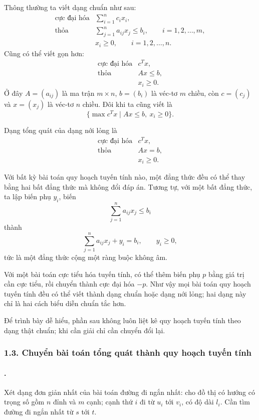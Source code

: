 \documentclass[11pt]{article}
\begin{document}
Thông thường ta viết dạng chuẩn như sau:
\[
\begin{array}{ll}
\text{cực đại hóa} & \displaystyle \sum_{i=1}^{n} c_ix_i,\\[0.4em]
\text{thỏa} & \displaystyle \sum_{j=1}^{n}a_{ij}x_j\le b_i,
  \qquad i=1,2,\ldots,m,\\[0.4em]
& x_i\ge 0,\qquad i=1,2,\ldots,n.
\end{array}
\]
Cũng có thể viết gọn hơn:
\[
\begin{array}{ll}
\text{cực đại hóa} & c^Tx,\\
\text{thỏa} & Ax\le b,\\
& x_i\ge 0.
\end{array}
\]
Ở đây \(A=(a_{ij})\) là ma trận \(m\times n\), \(b=(b_i)\) là véc-tơ
\(m\) chiều, còn \(c=(c_j)\) và \(x=(x_j)\) là véc-tơ \(n\) chiều. Đôi khi
ta cũng viết là
\[
  \{\max c^Tx\mid Ax\le b,\ x_i\ge 0\}.
\]

Dạng tổng quát của dạng nới lỏng là
\[
\begin{array}{ll}
\text{cực đại hóa} & c^Tx,\\
\text{thỏa} & Ax=b,\\
& x_i\ge 0.
\end{array}
\]

Với bất kỳ bài toán quy hoạch tuyến tính nào, một đẳng thức đều có thể thay
bằng hai bất đẳng thức mà không đổi đáp án. Tương tự, với một bất đẳng thức,
ta lập biến phụ \(y_i\), biến
\[
  \sum_{j=1}^{n}a_{ij}x_j\le b_i
\]
thành
\[
  \sum_{j=1}^{n}a_{ij}x_j+y_i=b_i,\qquad y_i\ge 0,
\]
tức là một đẳng thức cộng một ràng buộc không âm.

Với một bài toán cực tiểu hóa tuyến tính, có thể thêm biến phụ \(p\) bằng giá
trị cần cực tiểu, rồi chuyển thành cực đại hóa \(-p\). Như vậy mọi bài toán
quy hoạch tuyến tính đều có thể viết thành dạng chuẩn hoặc dạng nới lỏng; hai
dạng này chỉ là hai cách biểu diễn chuẩn tắc hơn.

Để trình bày dễ hiểu, phần sau không luôn liệt kê quy hoạch tuyến tính theo
dạng thật chuẩn; khi cần giải chỉ cần chuyển đổi lại.

\subsubsection*{1.3. Chuyển bài toán tổng quát thành quy hoạch tuyến tính}

\paragraph{.}
Xét dạng đơn giản nhất của bài toán đường đi ngắn nhất: cho đồ thị có hướng
có trọng số gồm \(n\) đỉnh và \(m\) cạnh; cạnh thứ \(i\) đi từ \(u_i\) tới
\(v_i\), có độ dài \(l_i\). Cần tìm đường đi ngắn nhất từ \(s\) tới \(t\).
\end{document}
